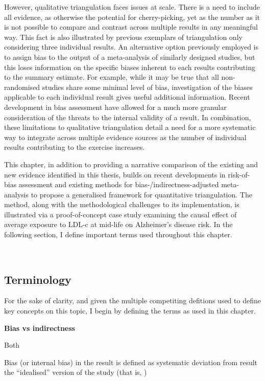 \documentclass[a4paper, twoside]{templates/ociamthesis}
\begin{document}
However, qualitative triangulation faces issues at scale. There is a need to include all evidence, as otherwise the potential for cherry-picking, yet as the number as it is not possible to compare and contrast across multiple results in any meaningful way. This fact is also illustrated by previous exemplars of triangulation only considering three individual results. An alternative option previously employed is to assign bias to the output of a meta-analysis of similarly designed studies, but this loses information on the specific biases inherent to each results contributing to the summary estimate. For example, while it may be true that all non-randomised studies share some minimal level of bias, investigation of the biases applicable to each individual result gives useful additional information. Recent development in bias assessment have allowed for a much more granular consideration of the threats to the internal validity of a result. In combination, these limitations to qualitative triangulation detail a need for a more systematic way to integrate across multiple evidence sources as the number of individual results contributing to the exercise increases.

This chapter, in addition to providing a narrative comparison of the existing and new evidence identified in this thesis, builds on recent developments in risk-of-bias assessment and existing methods for bias-/indirectness-adjusted meta-analysis to propose a generalised framework for quantitative triangulation. The method, along with the methodological challenges to its implementation, is illustrated via a proof-of-concept case study examining the causal effect of average exposure to LDL-c at mid-life on Alzheimer's disease risk. In the following section, I define important terms used throughout this chapter.

~

\newpage

\hypertarget{tri-terminology}{%
\subsection{Terminology}\label{tri-terminology}}

For the sake of clarity, and given the multiple competiting defitions used to define key concepts on this topic, I begin by defining the terms as used in this chapter.

\textbf{Bias vs indirectness}

Both

Bias (or internal bias) in the result is defined as systematic deviation from result the ``idealised'' version of the study (that is, )
\end{document}
